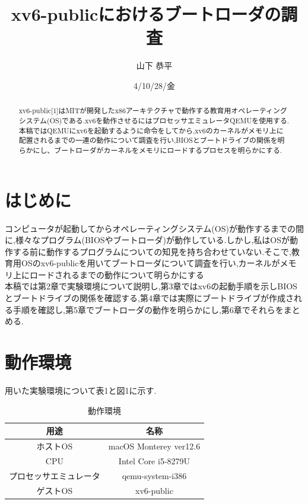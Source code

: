\documentclass[submit,techreq,noauthor]{eco}	%
\begin{document}
\date   {4/10/28/金}				%
\title  {xv6-publicにおけるブートローダの調査}	%
\author {山下 恭平}				%


\begin{abstract}
	xv6-public[1]はMITが開発したx86アーキテクチャで動作する教育用オペレーティングシステム(OS)である.xv6を動作させるにはプロセッサエミュレータQEMUを使用する.本稿ではQEMUにxv6を起動するように命令をしてから,xv6のカーネルがメモリ上に配置されるまでの一連の動作について調査を行い,BIOSとブートドライブの関係を明らかにし、ブートローダがカーネルをメモリにロードするプロセスを明らかにする.

\end{abstract}
\maketitle


\section{はじめに}
コンピュータが起動してからオペレーティングシステム(OS)が動作するまでの間に,様々なプログラム(BIOSやブートローダ)が動作している.しかし,私はOSが動作する前に動作するプログラムについての知見を持ち合わせていない.そこで,教育用OSのxv6-publicを用いてブートローダについて調査を行い,カーネルがメモリ上にロードされるまでの動作について明らかにする\\
\indent 本稿では第2章で実験環境について説明し,第3章ではxv6の起動手順を示しBIOSとブートドライブの関係を確認する,第4章では実際にブートドライブが作成される手順を確認し,第5章でブートローダの動作を明らかにし,第6章でそれらをまとめる.

\section{動作環境}
用いた実験環境について表1と図1に示す.

\begin{table}[H]
	\caption{動作環境}
	\label{table:data_type}
	\begin{tabular}{|c|c|}
		\hline
		用途                   & 名称                   \\ \hline \hline
		ホストOS               & macOS Monterey ver12.6 \\ \hline
		CPU                    & Intel Core i5-8279U    \\ \hline
		プロセッサエミュレータ & qemu-system-i386       \\ \hline
		ゲストOS               & xv6-public             \\ \hline
	\end{tabular}
\end{table}
\end{document}
